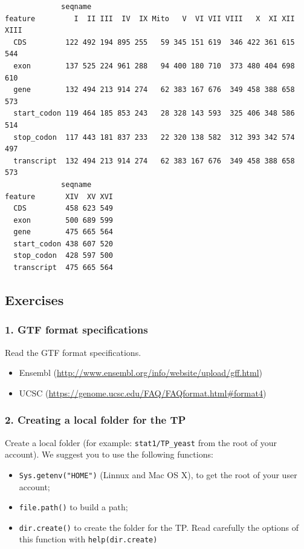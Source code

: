 \documentclass[]{article}
\providecommand{\tightlist}{%
  \setlength{\itemsep}{0pt}\setlength{\parskip}{0pt}}
\begin{document}
\begin{verbatim}
             seqname
feature         I  II III  IV  IX Mito   V  VI VII VIII   X  XI XII XIII
  CDS         122 492 194 895 255   59 345 151 619  346 422 361 615  544
  exon        137 525 224 961 288   94 400 180 710  373 480 404 698  610
  gene        132 494 213 914 274   62 383 167 676  349 458 388 658  573
  start_codon 119 464 185 853 243   28 328 143 593  325 406 348 586  514
  stop_codon  117 443 181 837 233   22 320 138 582  312 393 342 574  497
  transcript  132 494 213 914 274   62 383 167 676  349 458 388 658  573
             seqname
feature       XIV  XV XVI
  CDS         458 623 549
  exon        500 689 599
  gene        475 665 564
  start_codon 438 607 520
  stop_codon  428 597 500
  transcript  475 665 564
\end{verbatim}

\subsection{Exercises}\label{exercises}

\subsubsection{1. GTF format
specifications}\label{gtf-format-specifications}

Read the GTF format specifications.

\begin{itemize}
\tightlist
\item
  Ensembl (\url{http://www.ensembl.org/info/website/upload/gff.html})
\item
  UCSC (\url{https://genome.ucsc.edu/FAQ/FAQformat.html\#format4})
\end{itemize}

\subsubsection{2. Creating a local folder for the
TP}\label{creating-a-local-folder-for-the-tp}

Create a local folder (for example: \texttt{stat1/TP\_yeast} from the
root of your account). We suggest you to use the following functions:

\begin{itemize}
\tightlist
\item
  \texttt{Sys.getenv("HOME")} (Linnux and Mac OS X), to get the root of
  your user account;
\item
  \texttt{file.path()} to build a path;
\item
  \texttt{dir.create()} to create the folder for the TP. Read carefully
  the options of this function with \texttt{help(dir.create)}
\end{itemize}
\end{document}
